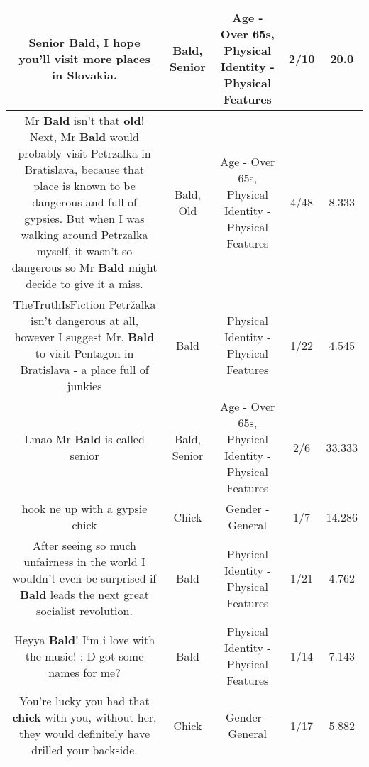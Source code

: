 \documentclass[11pt]{article}
\newlength\mylength
\begin{document}
\begin{center}
\begin{longtable}{|C{.65\mylength}|C{.30\mylength}|C{.12\mylength}|C{.12\mylength}|C{.12\mylength}|}
  \small Senior \textbf{Bald}, I hope you'll visit more places in Slovakia.\normalsize   & Bald, Senior & Age - Over 65s, Physical Identity - Physical Features & 2/10 & 20.0 \\  \hline
  \small Mr \textbf{Bald} isn't that \textbf{old}! Next, Mr \textbf{Bald} would probably visit Petrzalka in Bratislava, because that place is known to be dangerous and full of gypsies. But when I was walking around Petrzalka myself, it wasn't so dangerous so Mr \textbf{Bald} might decide to give it a miss.\normalsize   & Bald, Old & Age - Over 65s, Physical Identity - Physical Features & 4/48 & 8.333 \\  \hline
  \small TheTruthIsFiction Petržalka isn't dangerous at all, however I suggest Mr. \textbf{Bald} to visit Pentagon in Bratislava - a place full of junkies\normalsize   & Bald & Physical Identity - Physical Features & 1/22 & 4.545 \\  \hline
  \small Lmao Mr \textbf{Bald} is called senior\normalsize   & Bald, Senior & Age - Over 65s, Physical Identity - Physical Features & 2/6 & 33.333 \\  \hline
  \small hook ne up with a gypsie chick\normalsize   & Chick & Gender - General & 1/7 & 14.286 \\  \hline
  \small After seeing so much unfairness in the world I wouldn't even be surprised if \textbf{Bald} leads the next great socialist revolution.\normalsize   & Bald & Physical Identity - Physical Features & 1/21 & 4.762 \\  \hline
  \small Heyya \textbf{Bald}! I‘m i love with the music! :-D got some  names for me?\normalsize   & Bald & Physical Identity - Physical Features & 1/14 & 7.143 \\  \hline
  \small You're lucky you had that \textbf{chick} with you, without her, they would definitely have drilled your backside.\normalsize   & Chick & Gender - General & 1/17 & 5.882 \\  \hline

\end{longtable}
\end{center}
\end{document}

